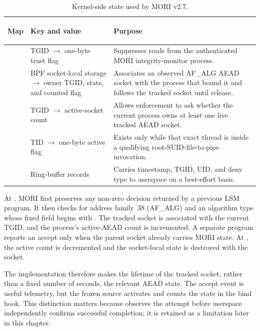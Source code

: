 \begin{table}[H]
    \centering
    \caption{Kernel-side state used by MORI v2.7.}
    \label{tab:mori-v27-state}
    \small
    \begin{tabularx}{\textwidth}{@{}>{\bfseries\raggedright\arraybackslash}p{}>{\raggedright\arraybackslash}p{}Y@{}}
        \toprule
        Map & Key and value & Purpose \\
        \midrule
         & TGID $\rightarrow$ one-byte trust flag &
        Suppresses reads from the authenticated MORI integrity-monitor process. \\

         & BPF socket-local storage $\rightarrow$
        owner TGID, state, and counted flag &
        Associates an observed AF\_ALG AEAD socket with the process that bound
        it and follows the tracked socket until release. \\

         & TGID $\rightarrow$ active-socket count &
        Allows enforcement to ask whether the current process owns at least one
        live tracked AEAD socket. \\

         & TID $\rightarrow$ one-byte active flag &
        Exists only while that exact thread is inside a qualifying
        root-SUID-file-to-pipe  invocation. \\

         & Ring-buffer records &
        Carries timestamp, TGID, UID, and deny type to userspace on a
        best-effort basis. \\
        \bottomrule
    \end{tabularx}
\end{table}

At , MORI first preserves any non-zero decision returned
by a previous LSM program. It then checks for address family~38 (AF\_ALG) and
an algorithm type whose fixed field begins with . The tracked socket
is associated with the current TGID, and the process's active-AEAD count is
incremented. A separate  program reports an accept only
when the parent socket already carries MORI state. At
, the active count is decremented and the
socket-local state is destroyed with the socket.

The implementation therefore makes the lifetime of the tracked socket, rather
than a fixed number of seconds, the relevant AEAD state. The accept event is
useful telemetry, but the frozen source activates and counts the state in the
bind hook. This distinction matters because  observes the
attempt before userspace independently confirms successful completion; it is
retained as a limitation later in this chapter.

